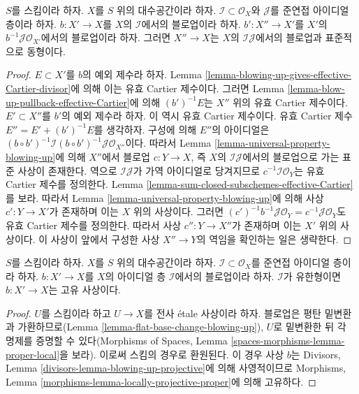 \begin{lemma}
\label{lemma-blowing-up-two-ideals}
$S$를 스킴이라 하자. $X$를 $S$ 위의 대수공간이라 하자.
$\mathcal{I} \subset \mathcal{O}_X$와 $\mathcal{J}$를 준연접 아이디얼
층이라 하자. $b : X' \to X$를 $X$의 $\mathcal{I}$에서의 블로업이라
하자. $b' : X'' \to X'$를 $X'$의
$b^{-1}\mathcal{J} \mathcal{O}_{X'}$에서의 블로업이라 하자.
그러면 $X'' \to X$는 $X$의 $\mathcal{I}\mathcal{J}$에서의 블로업과
표준적으로 동형이다.
\end{lemma}

\begin{proof}
$E \subset X'$를 $b$의 예외 제수라 하자. Lemma
\ref{lemma-blowing-up-gives-effective-Cartier-divisor}에 의해 이는
유효 Cartier 제수이다. 그러면 Lemma
\ref{lemma-blow-up-pullback-effective-Cartier}에 의해
$(b')^{-1}E$는 $X''$ 위의 유효 Cartier 제수이다.
$E' \subset X''$를 $b'$의 예외 제수라 하자. 이 역시 유효 Cartier
제수이다. 유효 Cartier 제수
$E'' = E' + (b')^{-1}E$를 생각하자. 구성에 의해 $E''$의 아이디얼은
$(b \circ b')^{-1}\mathcal{I} (b \circ b')^{-1}\mathcal{J}
\mathcal{O}_{X''}$이다. 따라서 Lemma
\ref{lemma-universal-property-blowing-up}에 의해 $X''$에서 블로업
$c : Y \to X$, 즉 $X$의 $\mathcal{I}\mathcal{J}$에서의 블로업으로 가는
표준 사상이 존재한다. 역으로 $\mathcal{I}\mathcal{J}$가 가역
아이디얼로 당겨지므로
$c^{-1}\mathcal{I}\mathcal{O}_Y$는 유효 Cartier 제수를 정의한다.
Lemma \ref{lemma-sum-closed-subschemes-effective-Cartier}를 보라.
따라서 Lemma \ref{lemma-universal-property-blowing-up}에 의해 사상
$c' : Y \to X'$가 존재하며 이는 $X$ 위의 사상이다. 그러면
$(c')^{-1}b^{-1}\mathcal{J}\mathcal{O}_Y =
c^{-1}\mathcal{J}\mathcal{O}_Y$도 유효 Cartier 제수를 정의한다.
따라서 사상 $c'' : Y \to X''$가 존재하며 이는 $X'$ 위의 사상이다.
이 사상이 앞에서
구성한 사상 $X'' \to Y$의 역임을 확인하는 일은 생략한다.
\end{proof}

\begin{lemma}
\label{lemma-blowing-up-projective}
$S$를 스킴이라 하자. $X$를 $S$ 위의 대수공간이라 하자.
$\mathcal{I} \subset \mathcal{O}_X$를 준연접 아이디얼 층이라 하자.
$b : X' \to X$를 $X$의 아이디얼 층 $\mathcal{I}$에서의 블로업이라 하자.
$\mathcal{I}$가 유한형이면 $b : X' \to X$는 고유 사상이다.
\end{lemma}

\begin{proof}
$U$를 스킴이라 하고 $U \to X$를 전사 \'etale 사상이라 하자.
블로업은 평탄 밑변환과 가환하므로(Lemma
\ref{lemma-flat-base-change-blowing-up}), $U$로 밑변환한 뒤 각 명제를
증명할 수 있다(Morphisms of Spaces, Lemma
\ref{spaces-morphisms-lemma-proper-local}을 보라).
이로써 스킴의 경우로 환원된다. 이 경우 사상 $b$는 Divisors, Lemma
\ref{divisors-lemma-blowing-up-projective}에 의해 사영적이므로
Morphisms, Lemma \ref{morphisms-lemma-locally-projective-proper}에 의해
고유하다.
\end{proof}

